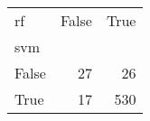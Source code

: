 \begin{tabular}{lrr}
\toprule
rf &  False &  True  \\
svm   &        &        \\
\midrule
False &     27 &     26 \\
True  &     17 &    530 \\
\bottomrule
\end{tabular}
